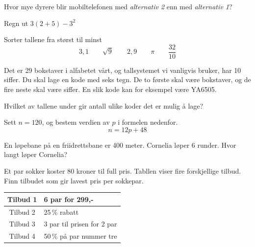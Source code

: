Hvor mye dyrere blir mobiltelefonen med \textsl{alternativ 2} enn med \textsl{alternativ 1}?

Regn ut $ 3(2+5)-3^2  $

Sorter tallene fra størst til minst
\[ 3,1\qquad\sqrt{9}\qquad2,9\qquad\pi \qquad \frac{32}{10} \]

\newpage
{}
Det er 29 bokstaver i alfabetet vårt, og tallsystemet vi vanligvis bruker, har 10 siffer.
Du skal lage en kode med seks tegn. De to første skal være bokstaver, og de fire neste skal være
siffer. En slik kode kan for eksempel være YA6505. \os

Hvilket av tallene under gir antall ulike koder det er mulig å lage? \os
{}

Sett $ n=120 $, og bestem verdien av $ p $ i formelen nedenfor. 
\[ n = 12p + 48 \]

En løpebane på en friidrettsbane er 400 meter.
Cornelia løper 6 runder. Hvor langt løper Cornelia? \os



Et par sokker koster 80 kroner til full pris. Tabllen viser fire forskjellige tilbud. Finn tilbudet som gir lavest pris per sokkepar. 
\begin{center}
	\renewcommand{\arraystretch}{1.5}
	\begin{table}[h]
		\centering
		\begin{tabular}{|c|l|}
			\hline
			Tilbud 1 & 6 par for 299,- \\
			\hline
			Tilbud 2 & 25\,\% rabatt \\
			\hline
			Tilbud 3 & 3 par til prisen for 2 par \\
			\hline
			Tilbud 4 & 50\,\% på par nummer tre \\
			\hline
		\end{tabular}
	\end{table}
\end{center}

